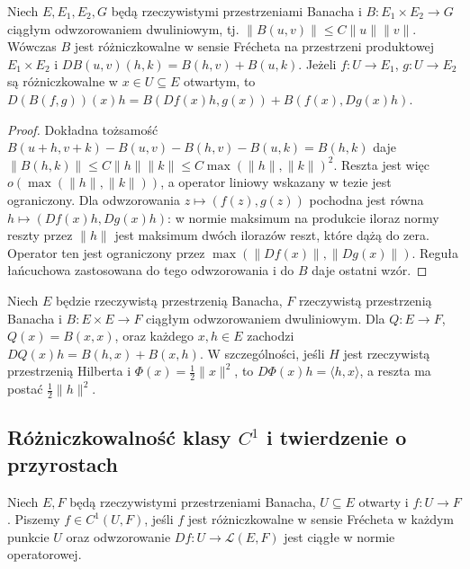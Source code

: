 \begin{twierdzenie}
\label{thm:bilinear14}
Niech $E,E_1,E_2,G$ będą rzeczywistymi przestrzeniami Banacha i $B:E_1\times E_2\to G$ ciągłym odwzorowaniem dwuliniowym, tj. $\|B(u,v)\|\le C\|u\|\|v\|$. Wówczas $B$ jest różniczkowalne w sensie Frécheta na przestrzeni produktowej $E_1\times E_2$ i
$DB(u,v)(h,k)=B(h,v)+B(u,k)$.
Jeżeli $f:U\to E_1$, $g:U\to E_2$ są różniczkowalne w $x\in U\subseteq E$ otwartym, to
$D(B(f,g))(x)h=B(Df(x)h,g(x))+B(f(x),Dg(x)h)$.
\end{twierdzenie}
\begin{proof}
Dokładna tożsamość
$B(u+h,v+k)-B(u,v)-B(h,v)-B(u,k)=B(h,k)$
daje $\|B(h,k)\|\le C\|h\|\|k\|\le C\max(\|h\|,\|k\|)^2$. Reszta jest więc $o(\max(\|h\|,\|k\|))$, a operator liniowy wskazany w tezie jest ograniczony. Dla odwzorowania $z\mapsto(f(z),g(z))$ pochodna jest równa $h\mapsto(Df(x)h,Dg(x)h)$: w normie maksimum na produkcie iloraz normy reszty przez $\|h\|$ jest maksimum dwóch ilorazów reszt, które dążą do zera. Operator ten jest ograniczony przez $\max(\|Df(x)\|,\|Dg(x)\|)$. Reguła łańcuchowa zastosowana do tego odwzorowania i do $B$ daje ostatni wzór.
\end{proof}

\begin{przyklad}
\label{ex:quadratic14}
Niech $E$ będzie rzeczywistą przestrzenią Banacha, $F$ rzeczywistą przestrzenią Banacha i $B:E\times E\to F$ ciągłym odwzorowaniem dwuliniowym. Dla $Q:E\to F$, $Q(x)=B(x,x)$, oraz każdego $x,h\in E$ zachodzi
$DQ(x)h=B(h,x)+B(x,h)$.
W szczególności, jeśli $H$ jest rzeczywistą przestrzenią Hilberta i $\Phi(x)=\frac12\|x\|^2$, to
$D\Phi(x)h=\langle h,x\rangle$, a reszta ma postać $\frac12\|h\|^2$.
\end{przyklad}

\subsection{Różniczkowalność klasy \texorpdfstring{$C^1$}{C1} i twierdzenie o przyrostach}

\begin{definicja}[Klasa $C^1$]
\label{def:c1-14}
Niech $E,F$ będą rzeczywistymi przestrzeniami Banacha, $U\subseteq E$ otwarty i $f:U\to F$. Piszemy $f\in C^1(U,F)$, jeśli $f$ jest różniczkowalne w sensie Frécheta w każdym punkcie $U$ oraz odwzorowanie $Df:U\to\mathcal L(E,F)$ jest ciągłe w normie operatorowej.
\end{definicja}

